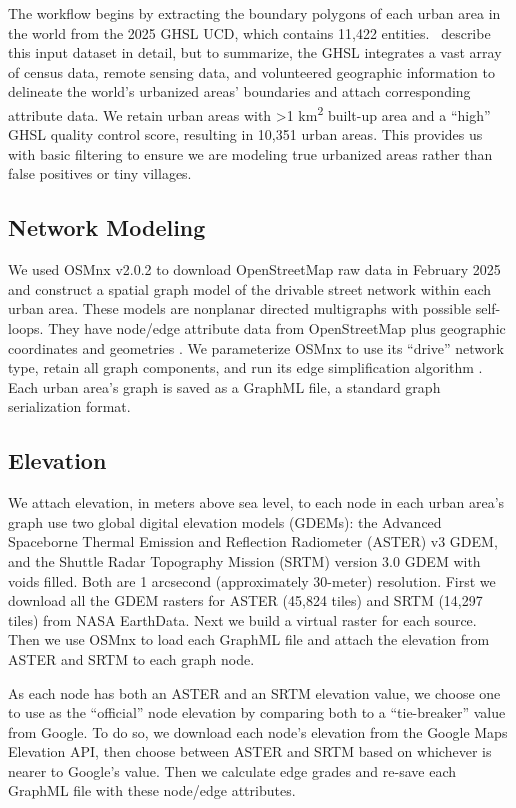 \documentclass[12pt,letterpaper]{article} %
\begin{document}
The workflow begins by extracting the boundary polygons of each urban area in the world from the 2025 GHSL UCD, which contains 11,422 entities.\ \citet{mari_rivero_urban_2025} describe this input dataset in detail, but to summarize, the GHSL integrates a vast array of census data, remote sensing data, and volunteered geographic information to delineate the world's urbanized areas' boundaries and attach corresponding attribute data. We retain urban areas with >1 km\textsuperscript{2} built-up area and a \enquote{high} GHSL quality control score, resulting in 10,351 urban areas. This provides us with basic filtering to ensure we are modeling true urbanized areas rather than false positives or tiny villages.

\subsection{Network Modeling}

We used OSMnx v2.0.2 to download OpenStreetMap raw data in February 2025 and construct a spatial graph model of the drivable street network within each urban area. These models are nonplanar directed multigraphs with possible self-loops. They have node/edge attribute data from OpenStreetMap plus geographic coordinates and geometries \citep{boeing_modeling_2025}. We parameterize OSMnx to use its \enquote{drive} network type, retain all graph components, and run its edge simplification algorithm \citep{boeing_topological_2025}. Each urban area's graph is saved as a GraphML file, a standard graph serialization format.

\subsection{Elevation}

We attach elevation, in meters above sea level, to each node in each urban area's graph use two global digital elevation models (GDEMs): the Advanced Spaceborne Thermal Emission and Reflection Radiometer (ASTER) v3 GDEM, and the Shuttle Radar Topography Mission (SRTM) version 3.0 GDEM with voids filled.
Both are 1 arcsecond (approximately 30-meter) resolution. First we download all the GDEM rasters for ASTER (45,824 tiles) and SRTM (14,297 tiles) from NASA EarthData. Next we build a virtual raster for each source. Then we use OSMnx to load each GraphML file and attach the elevation from ASTER and SRTM to each graph node.

As each node has both an ASTER and an SRTM elevation value, we choose one to use as the \enquote{official} node elevation by comparing both to a \enquote{tie-breaker} value from Google. To do so, we download each node's elevation from the Google Maps Elevation API, then choose between ASTER and SRTM based on whichever is nearer to Google's value. Then we calculate edge grades and re-save each GraphML file with these node/edge attributes.
\end{document}
